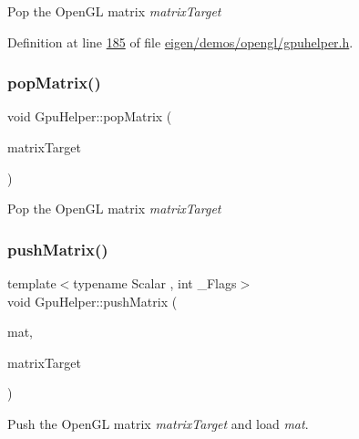 Pop the Open\+GL matrix {\itshape matrix\+Target} 

Definition at line \hyperlink{eigen_2demos_2opengl_2gpuhelper_8h_source_l00185}{185} of file \hyperlink{eigen_2demos_2opengl_2gpuhelper_8h_source}{eigen/demos/opengl/gpuhelper.\+h}.

\mbox{\label{class_gpu_helper_aad0cc23c2eaf0dcc610b180e5c8b195e}} 
\subsubsection{\texorpdfstring{pop\+Matrix()}{popMatrix()}\hspace{0.1cm}{\footnotesize\ttfamily [2/2]}}
{\footnotesize\ttfamily void Gpu\+Helper\+::pop\+Matrix (\begin{DoxyParamCaption}\item[{G\+Lenum}]{matrix\+Target }\end{DoxyParamCaption})\hspace{0.3cm}{\ttfamily [inline]}}

Pop the Open\+GL matrix {\itshape matrix\+Target} \mbox{\label{class_gpu_helper_ac51c8b669a80ca6e4338c87136fb991e}} 
\subsubsection{\texorpdfstring{push\+Matrix()}{pushMatrix()}\hspace{0.1cm}{\footnotesize\ttfamily [1/4]}}
{\footnotesize\ttfamily template$<$typename Scalar , int \+\_\+\+Flags$>$ \\
void Gpu\+Helper\+::push\+Matrix (\begin{DoxyParamCaption}\item[{const \hyperlink{group___core___module_class_eigen_1_1_matrix}{Matrix}$<$ Scalar, 4, 4, \+\_\+\+Flags, 4, 4 $>$ \&}]{mat,  }\item[{G\+Lenum}]{matrix\+Target }\end{DoxyParamCaption})\hspace{0.3cm}{\ttfamily [inline]}}

Push the Open\+GL matrix {\itshape matrix\+Target} and load {\itshape mat}. \mbox{\label{class_gpu_helper_ac51c8b669a80ca6e4338c87136fb991e}} 
